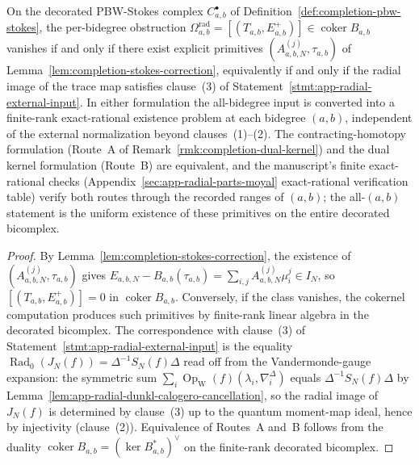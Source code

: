 \begin{thm}
\label{thm:completion-omega-rad-vanishes}
On the decorated PBW-Stokes complex
\(C^\bullet_{a,b}\) of Definition~\ref{def:completion-pbw-stokes},
the per-bidegree obstruction
\(\Omega^{\mathrm{rad}}_{a,b}=[(T_{a,b},E^+_{a,b})]\in
\operatorname{coker}B_{a,b}\) vanishes if and only if there exist
explicit primitives
\((A^{(j)}_{a,b,N},\tau_{a,b})\) of
Lemma~\ref{lem:completion-stokes-correction}, equivalently if and
only if the radial image of the trace map satisfies
clause~(3) of Statement~\ref{stmt:app-radial-external-input}.  In
either formulation the all-bidegree input is converted into a
finite-rank exact-rational existence problem at each bidegree
\((a,b)\), independent of the external normalization beyond
clauses~(1)--(2).  The contracting-homotopy formulation
(Route~A of Remark~\ref{rmk:completion-dual-kernel}) and the dual
kernel formulation (Route~B) are equivalent, and the manuscript's
finite exact-rational checks
(Appendix~\ref{sec:app-radial-parts-moyal} exact-rational verification table)
verify both routes through the recorded ranges of \((a,b)\); the
all-\((a,b)\) statement is the uniform existence of these
primitives on the entire decorated bicomplex.
\end{thm}

\begin{proof}
By Lemma~\ref{lem:completion-stokes-correction}, the existence of
\((A^{(j)}_{a,b,N},\tau_{a,b})\) gives
\(E_{a,b,N}-B_{a,b}(\tau_{a,b})=\sum_{i,j}A^{(j)}_{a,b,N}\mu^j_i\in
I_N\), so \([(T_{a,b},E^+_{a,b})]=0\) in
\(\operatorname{coker}B_{a,b}\).  Conversely, if the class
vanishes, the cokernel computation produces such primitives by
finite-rank linear algebra in the decorated bicomplex.  The
correspondence with clause~(3) of
Statement~\ref{stmt:app-radial-external-input} is the equality
\(\operatorname{Rad}_0(J_N(f))=\Delta^{-1}S_N(f)\Delta\) read off
from the Vandermonde-gauge expansion: the symmetric sum
\(\sum_i\operatorname{Op}_{\mathrm W}(f)(\lambda_i,\nabla^\Delta_i)\)
equals \(\Delta^{-1}S_N(f)\Delta\) by
Lemma~\ref{lem:app-radial-dunkl-calogero-cancellation}, so the
radial image of \(J_N(f)\) is determined by clause~(3) up to the
quantum moment-map ideal, hence by injectivity (clause~(2)).
Equivalence of Routes~A and~B follows from the duality
\(\operatorname{coker}B_{a,b}=(\ker B^*_{a,b})^\vee\) on the
finite-rank decorated bicomplex.
\end{proof}

